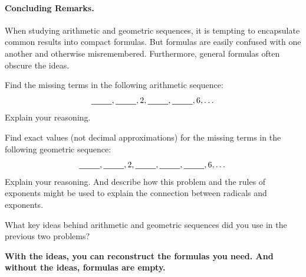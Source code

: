 \paragraph{Concluding Remarks.}  When studying arithmetic and geometric sequences, it is tempting to encapsulate common results into compact formulas.  But formulas are easily confused with one another and otherwise misremembered.  Furthermore, general formulas often obscure the ideas.  

\begin{question}
Find the missing terms in the following arithmetic sequence:  
$$\rule[-2pt]{25pt}{.5pt}, \rule[-2pt]{25pt}{.5pt},  2,  \rule[-2pt]{25pt}{.5pt}, \rule[-2pt]{25pt}{.5pt}, 6, \dots$$
Explain your reasoning.  
\end{question}

\begin{question}
Find exact values (not decimal approximations) for the missing terms in the following geometric sequence:  
$$\rule[-2pt]{25pt}{.5pt}, \rule[-2pt]{25pt}{.5pt},  2,  \rule[-2pt]{25pt}{.5pt},  \rule[-2pt]{25pt}{.5pt}, \rule[-2pt]{25pt}{.5pt}, 6, \dots$$
Explain your reasoning.  And describe how this problem and the rules of exponents might be used to explain the connection between radicals and exponents.  
\end{question}

\begin{question}
What key ideas behind arithmetic and geometric sequences did you use in the previous two problems? 
\end{question}

\begin{center}
\textbf{With the ideas, you can reconstruct the formulas you need.  And without the ideas, formulas are empty.}  
\end{center}

